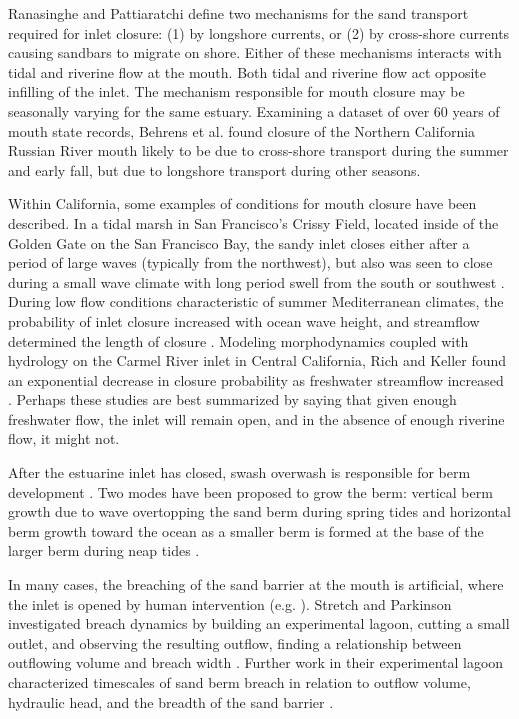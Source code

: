Ranasinghe and Pattiaratchi \parencite*{ranasinghe_seasonal_2003} define two mechanisms for the sand transport required for inlet closure: (1) by longshore currents, or (2) by cross-shore currents causing sandbars to migrate on shore. Either of these mechanisms interacts  with tidal and riverine flow at the mouth. Both tidal and riverine flow act opposite infilling of the inlet. The mechanism responsible for mouth closure may be seasonally varying for the same estuary. Examining a dataset of over 60 years of mouth state records, Behrens et al. \parencite*{behrens_episodic_2013} found closure of the Northern California Russian River mouth likely to be due to cross-shore transport during the summer and early fall, but due to longshore transport during other seasons.

Within California, some examples of conditions for mouth closure have been described. In a tidal marsh in San Francisco's Crissy Field, located inside of the Golden Gate on the San Francisco Bay, the sandy inlet closes either after a period of large waves (typically from the northwest), but also was seen to close during a small wave climate with long period swell from the south or southwest \parencite{hanes_waves_2011}. During low flow conditions characteristic of summer Mediterranean climates, the probability of inlet closure increased with ocean wave height, and streamflow determined the length of closure \parencite{behrens_episodic_2013}. Modeling morphodynamics coupled with hydrology on the Carmel River inlet in Central California, Rich and Keller found an exponential decrease in closure probability as freshwater streamflow increased \parencite*{rich_hydrologic_2013}. Perhaps these studies are best summarized by saying that given enough freshwater flow, the inlet will remain open, and in the absence of enough riverine flow, it might not.

After the estuarine inlet has closed, swash overwash is responsible for berm development \parencite{baldock_morphodynamic_2008}. Two modes have been proposed to grow the berm: vertical berm growth due to wave overtopping the sand berm during spring tides and horizontal berm growth toward the ocean as a smaller berm is formed at the base of the larger berm during neap tides \parencite{weir_beach_2006}. 

In many cases, the breaching of the sand barrier at the mouth is artificial, where the inlet is opened by human intervention (e.g. \cite{fortunato_morphological_2014, behrens_episodic_2013}). Stretch and Parkinson investigated breach dynamics by building an experimental lagoon, cutting a small outlet, and observing the resulting outflow, finding a relationship between outflowing volume and breach width \parencite*{stretch_breaching_2006}. Further work in their experimental lagoon characterized timescales of sand berm breach in relation to outflow volume, hydraulic head, and the breadth of the sand barrier \parencite{parkinson_breaching_2007}. 


